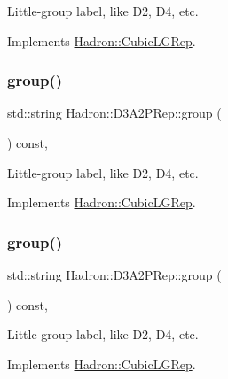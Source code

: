 Little-\/group label, like D2, D4, etc. 

Implements \mbox{\hyperlink{structHadron_1_1CubicLGRep_a9bdb14b519a611d21379ed96a3a9eb41}{Hadron\+::\+Cubic\+L\+G\+Rep}}.

\mbox{\label{structHadron_1_1D3A2PRep_a920496e210c2cdc2edb80a9903cd443a}} 
\subsubsection{\texorpdfstring{group()}{group()}\hspace{0.1cm}{\footnotesize\ttfamily [2/3]}}
{\footnotesize\ttfamily std\+::string Hadron\+::\+D3\+A2\+P\+Rep\+::group (\begin{DoxyParamCaption}{ }\end{DoxyParamCaption}) const\hspace{0.3cm}{\ttfamily [inline]}, {\ttfamily [virtual]}}

Little-\/group label, like D2, D4, etc. 

Implements \mbox{\hyperlink{structHadron_1_1CubicLGRep_a9bdb14b519a611d21379ed96a3a9eb41}{Hadron\+::\+Cubic\+L\+G\+Rep}}.

\mbox{\label{structHadron_1_1D3A2PRep_a920496e210c2cdc2edb80a9903cd443a}} 
\subsubsection{\texorpdfstring{group()}{group()}\hspace{0.1cm}{\footnotesize\ttfamily [3/3]}}
{\footnotesize\ttfamily std\+::string Hadron\+::\+D3\+A2\+P\+Rep\+::group (\begin{DoxyParamCaption}{ }\end{DoxyParamCaption}) const\hspace{0.3cm}{\ttfamily [inline]}, {\ttfamily [virtual]}}

Little-\/group label, like D2, D4, etc. 

Implements \mbox{\hyperlink{structHadron_1_1CubicLGRep_a9bdb14b519a611d21379ed96a3a9eb41}{Hadron\+::\+Cubic\+L\+G\+Rep}}.

\mbox{\label{structHadron_1_1D3A2PRep_a8a5821f9be07ae2bd87e63ac151c6d68}} 
